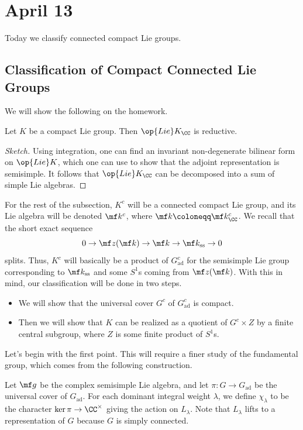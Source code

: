 \documentclass[../notes.tex]{subfiles}
\begin{document}
\section{April 13}
Today we classify connected compact Lie groups.

\subsection{Classification of Compact Connected Lie Groups}
We will show the following on the homework.
\begin{proposition} \label{prop:compact-to-reductive}
	Let $K$ be a compact Lie group. Then $\op{Lie}K_\CC$ is reductive.
\end{proposition}
\begin{proof}[Sketch]
	Using integration, one can find an invariant non-degenerate bilinear form on $\op{Lie}K$, which one can use to show that the adjoint representation is semisimple. It follows that $\op{Lie}K_\CC$ can be decomposed into a sum of simple Lie algebras.
\end{proof}
For the rest of the subsection, $K^c$ will be a connected compact Lie group, and its Lie algebra will be denoted $\mf k^c$, where $\mf k\coloneqq\mf k^c_\CC$. We recall that the short exact sequence
\[0\to\mf z(\mf k)\to\mf k\to\mf k_{\mathrm{ss}}\to0\]
splits. Thus, $K^c$ will basically be a product of $G_{\mathrm{ad}}^c$ for the semisimple Lie group corresponding to $\mf k_{\mathrm{ss}}$ and some $S^1$s coming from $\mf z(\mf k)$. With this in mind, our classification will be done in two steps.
\begin{itemize}
	\item We will show that the universal cover $G^c$ of $G_{\mathrm{ad}}^c$ is compact.
	\item Then we will show that $K$ can be realized as a quotient of $G^c\times Z$ by a finite central subgroup, where $Z$ is some finite product of $S^1$s.
\end{itemize}
Let's begin with the first point. This will require a finer study of the fundamental group, which comes from the following construction.
\begin{definition}
	Let $\mf g$ be the complex semisimple Lie algebra, and let $\pi\colon G\to G_{\mathrm{ad}}$ be the universal cover of $G_{\mathrm{ad}}$. For each dominant integral weight $\lambda$, we define $\chi_\lambda$ to be the character $\ker\pi\to\CC^\times$ giving the action on $L_\lambda$. Note that $L_\lambda$ lifts to a representation of $G$ because $G$ is simply connected.
\end{definition}
\end{document}
